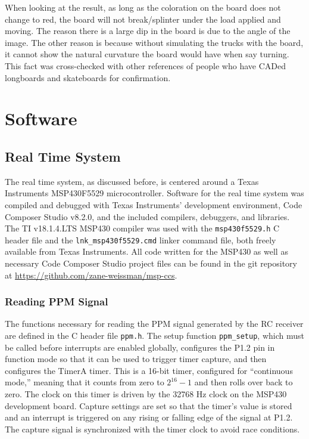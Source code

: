 \documentclass[letterpaper,12pt]{article}
\begin{document}
When looking at the result, as long as the coloration on the board does not change to red, the board will not break/splinter under the load applied and moving. The reason there is a large dip in the board is due to the angle of the image. The other reason is because without simulating the trucks with the board, it cannot show the natural curvature the board would have when say turning. This fact was cross-checked with other references of people who have CADed longboards and skateboards for confirmation.

\section{Software}
\subsection{Real Time System}
The real time system, as discussed before, is centered around a Texas Instruments MSP430F5529 microcontroller. Software for the real time system was compiled and debugged with Texas Instruments' development environment, Code Composer Studio v8.2.0, and the included compilers, debuggers, and libraries. The TI v18.1.4.LTS MSP430 compiler was used with the \texttt{msp430f5529.h} C header file and the \texttt{lnk\_msp430f5529.cmd} linker command file, both freely available from Texas Instruments. All code written for the MSP430 as well as necessary Code Composer Studio project files can be found in the git repository at \url{https://github.com/zane-weissman/msp-ccs}.
\subsubsection{Reading PPM Signal}
The functions necessary for reading the PPM signal generated by the RC receiver are defined in the C header file \texttt{ppm.h}. The setup function \texttt{ppm\_setup}, which must be called before interrupts are enabled globally, configures the P1.2 pin in function mode so that it can be used to trigger timer capture, and then configures the TimerA timer. This is a 16-bit timer, configured for ``continuous mode,'' meaning that it counts from zero to $2^{16}-1$ and then rolls over back to zero. The clock on this timer is driven by the 32768 Hz clock on the MSP430 development board. Capture settings are set so that the timer's value is stored and an interrupt is triggered on any rising or falling edge of the signal at P1.2. The capture signal is synchronized with the timer clock to avoid race conditions.
\end{document}
